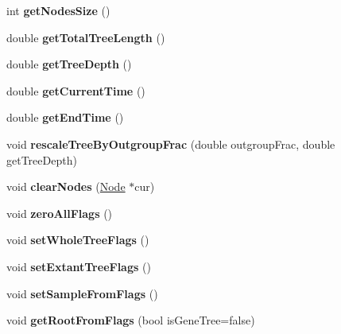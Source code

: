 \begin{DoxyCompactItemize}
int {\bfseries get\+Nodes\+Size} ()
\item 
\mbox{\label{class_tree_a578d40a7bf15a9db100bc8b2e7a9bef3}} 
double {\bfseries get\+Total\+Tree\+Length} ()
\item 
\mbox{\label{class_tree_a6d6a59aba8e6900676a8f44304177375}} 
double {\bfseries get\+Tree\+Depth} ()
\item 
\mbox{\label{class_tree_a3b17c505980d590707862e8359f05711}} 
double {\bfseries get\+Current\+Time} ()
\item 
\mbox{\label{class_tree_a4e3bcfaf2b2631ffb88f1275ddf7dafd}} 
double {\bfseries get\+End\+Time} ()
\item 
\mbox{\label{class_tree_ad043692b45509e1457ece5ed6abb6587}} 
void {\bfseries rescale\+Tree\+By\+Outgroup\+Frac} (double outgroup\+Frac, double get\+Tree\+Depth)
\item 
\mbox{\label{class_tree_a9dbc4fac0f489383e233ee72a0207e29}} 
void {\bfseries clear\+Nodes} (\mbox{\hyperlink{class_node}{Node}} $\ast$cur)
\item 
\mbox{\label{class_tree_ad6e5368b4973c714f0821a8ed7d9f43f}} 
void {\bfseries zero\+All\+Flags} ()
\item 
\mbox{\label{class_tree_a4637f41a9a1d678c9aaf431176c30814}} 
void {\bfseries set\+Whole\+Tree\+Flags} ()
\item 
\mbox{\label{class_tree_a6982f7dbc9d9997b12e22a677eb717fc}} 
void {\bfseries set\+Extant\+Tree\+Flags} ()
\item 
\mbox{\label{class_tree_a197ff1df11a9b035a01883a3f199e708}} 
void {\bfseries set\+Sample\+From\+Flags} ()
\item 
\mbox{\label{class_tree_a1aa1d75606f62fbdf6a1cf4d275f26d9}} 
void {\bfseries get\+Root\+From\+Flags} (bool is\+Gene\+Tree=false)
\item 
\mbox{\label{class_tree_abfc0d16344bcd0ecfee5199d10217b1b}} 

\end{DoxyCompactItemize}
